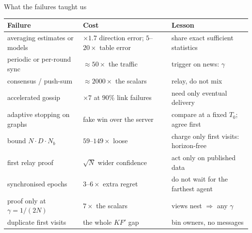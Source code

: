 \documentclass[11pt]{beamer}
\begin{document}
\begin{frame}{What the failures taught us}
\scriptsize
\renewcommand{\arraystretch}{1.15}
\begin{tabular}{@{}>{\raggedright\arraybackslash}p{3.4cm}>{\raggedright\arraybackslash}p{3.3cm}>{\raggedright\arraybackslash}p{4.0cm}@{}}
\toprule
\textbf{Failure} & \textbf{Cost} & \textbf{Lesson}\\
\midrule
averaging estimates or models & $\times1.7$ direction error; $5$--$20\times$ table error & share exact sufficient statistics\\
periodic or per-round sync & $\approx50\times$ the traffic & trigger on news: $\gamma$\\
consensus / push-sum & $\approx2000\times$ the scalars & relay, do not mix\\
accelerated gossip & $\times7$ at $90\%$ link failures & need only eventual delivery\\
adaptive stopping on graphs & fake win over the server & compare at a fixed $T_0$; agree first\\
bound $N\cdot D\cdot N_b$ & $59$--$149\times$ loose & charge only first visits: horizon-free\\
first relay proof & $\sqrt N$ wider confidence & act only on published data\\
synchronised epochs & $3$--$6\times$ extra regret & do not wait for the farthest agent\\
proof only at $\gamma=1/(2N)$ & $7\times$ the scalars & views nest $\Rightarrow$ any $\gamma$\\
duplicate first visits & the whole $KF'$ gap & bin owners, no messages\\
\bottomrule
\end{tabular}
\end{frame}
\end{document}
